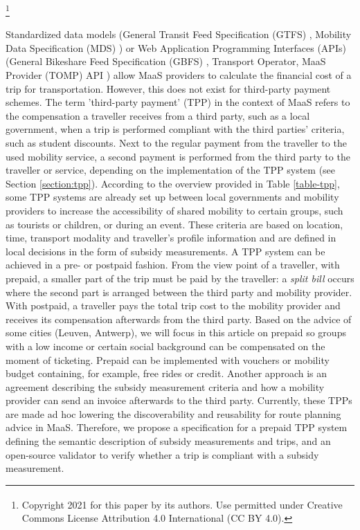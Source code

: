 \documentclass[runningheads]{llncs}
\newcommand\blfootnote[1]{%
\begingroup
\renewcommand\thefootnote{}\footnote{#1}%
\addtocounter{footnote}{-1}%
\endgroup
}
\begin{document}
\blfootnote{Copyright \textsuperscript{\textcopyright} 2021 for this paper by its authors. Use
permitted under Creative Commons License Attribution 4.0 International (CC BY 4.0).}

Standardized data models (General Transit Feed Specification (GTFS) \cite{gtfs}, Mobility Data Specification (MDS) \cite{mds}) or Web Application Programming Interfaces (APIs) (General Bikeshare Feed Specification (GBFS) \cite{gbfs}, Transport Operator, MaaS Provider (TOMP) API \cite{tompapi}) allow MaaS providers to calculate the financial cost of a trip for transportation. However, this does not exist for third-party payment schemes. The term 'third-party payment' (TPP) in the context of MaaS refers to the compensation a traveller receives from a third party, such as a local government, when a trip is performed compliant with the third parties' criteria, such as student discounts. Next to the regular payment from the traveller to the used mobility service, a second payment is performed from the third party to the traveller or service, depending on the implementation of the TPP system (see Section \ref{section:tpp}). According to the overview provided in Table \ref{table-tpp}, some TPP systems are already set up between local governments and mobility providers to increase the accessibility of shared mobility to certain groups, such as tourists or children, or during an event. These criteria are based on location, time, transport modality and traveller's profile information and are defined in local decisions in the form of subsidy measurements. A TPP system can be achieved in a pre- or postpaid fashion. From the view point of a traveller, with prepaid, a smaller part of the trip must be paid by the traveller: a \emph{split bill} occurs where the second part is arranged between the third party and mobility provider. With postpaid, a traveller pays the total trip cost to the mobility provider and receives its compensation afterwards from the third party. Based on the advice of some cities (Leuven, Antwerp), we will focus in this article on prepaid so groups with a low income or certain social background can be compensated on the moment of ticketing. Prepaid can be implemented with vouchers or mobility budget containing, for example, free rides or credit. Another approach is an agreement describing the subsidy measurement criteria and how a mobility provider can send an invoice afterwards to the third party. Currently, these TPPs are made ad hoc lowering the discoverability and reusability for route planning advice in MaaS. Therefore, we propose a specification for a prepaid TPP system defining the semantic description of subsidy measurements and trips, and an open-source validator to verify whether a trip is compliant with a subsidy measurement.
\end{document}
